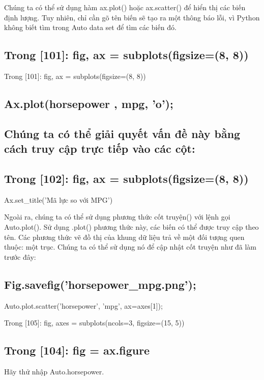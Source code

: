 Chúng ta có thể sử dụng hàm ax.plot() hoặc ax.scatter() để hiển thị các biến định lượng. Tuy nhiên, chỉ cần gõ tên biến sẽ tạo ra một thông báo lỗi, vì Python không biết tìm trong Auto data set để tìm các biến đó.

\subsection{Trong [101]: fig, ax = subplots(figsize=(8, 8))}

Trong [101]: fig, ax = subplots(figsize=(8, 8))

\subsection{Ax.plot(horsepower , mpg, 'o');}

\subsection{Chúng ta có thể giải quyết vấn đề này bằng cách truy cập trực tiếp vào các cột:}

\subsection{Trong [102]: fig, ax = subplots(figsize=(8, 8))}

Ax.set\_title('Mã lực so với MPG')

Ngoài ra, chúng ta có thể sử dụng phương thức cốt truyện() với lệnh gọi Auto.plot(). Sử dụng .plot() phương thức này, các biến có thể được truy cập theo tên. Các phương thức vẽ đồ thị của khung dữ liệu trả về một đối tượng quen thuộc: một trục. Chúng ta có thể sử dụng nó để cập nhật cốt truyện như đã làm trước đây:

\subsection{Fig.savefig('horsepower\_mpg.png');}

Auto.plot.scatter('horsepower', 'mpg', ax=axes[1]);

Trong [105]: fig, axes = subplots(ncols=3, figsize=(15, 5))

\subsection{Trong [104]: fig = ax.figure}

Hãy thử nhập Auto.horsepower.

